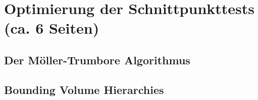 \section{Optimierung der Schnittpunkttests (ca. 6 Seiten)}

\subsection{Der Möller-Trumbore Algorithmus}
\subsection{Bounding Volume Hierarchies}